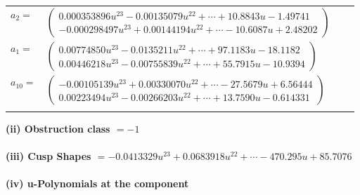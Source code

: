 \documentclass[1p]{elsarticle_modified}
\theoremstyle{definition}
\begin{document}
\begin{tabular}{m{7pt} m{180pt} m{7pt} m{180pt} }
\flushright $a_{2}=$&$\begin{pmatrix}0.000353896 u^{23}-0.00135079 u^{22}+\cdots+10.8843 u-1.49741\\-0.000298497 u^{23}+0.00144194 u^{22}+\cdots-10.6087 u+2.48202\end{pmatrix}$ \\
\flushright $a_{1}=$&$\begin{pmatrix}0.00774850 u^{23}-0.0135211 u^{22}+\cdots+97.1183 u-18.1182\\0.00446218 u^{23}-0.00755839 u^{22}+\cdots+55.7915 u-10.9394\end{pmatrix}$ \\
\flushright $a_{10}=$&$\begin{pmatrix}-0.00105139 u^{23}+0.00330070 u^{22}+\cdots-27.5679 u+6.56444\\0.00223494 u^{23}-0.00266203 u^{22}+\cdots+13.7590 u-0.614331\end{pmatrix}$\\&\end{tabular}
\flushleft \textbf{(ii) Obstruction class $= -1$}\\~\\
\flushleft \textbf{(iii) Cusp Shapes $= -0.0413329 u^{23}+0.0683918 u^{22}+\cdots-470.295 u+85.7076$}\\~\\
\newpage\renewcommand{\arraystretch}{1}
\flushleft \textbf{(iv) u-Polynomials at the component}\newline \\
\end{document}
